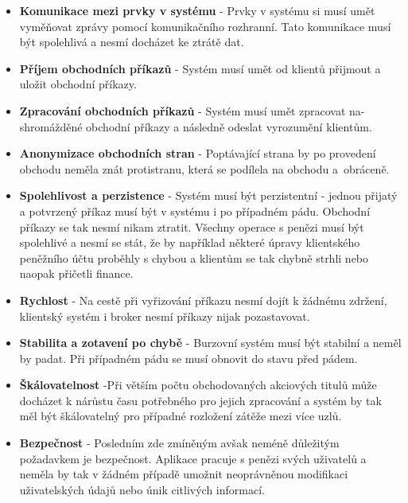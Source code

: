 \documentclass[thesis=M,czech]{FITthesis}[2012/06/26]
\begin{document}
\begin{itemize}

  \item \textbf{Komunikace mezi prvky v systému} - Prvky v systému si musí umět vyměňovat zprávy pomocí komunikačního rozhranní. Tato komunikace musí být spolehlivá a nesmí docházet ke ztrátě dat.

  \item \textbf{Příjem obchodních příkazů} - Systém musí umět od klientů přijmout a uložit obchodní příkazy.

  \item \textbf{Zpracování obchodních příkazů} - Systém musí umět zpracovat na-shromážděné obchodní příkazy a následně odeslat vyrozumění klientům.

  \item \textbf{Anonymizace obchodních stran} - Poptávající strana by po provedení obchodu neměla znát protistranu, která se podílela na obchodu a~obráceně.

  \item \textbf{Spolehlivost a perzistence} - Systém musí být perzistentní - jednou přijatý a potvrzený příkaz musí být v systému i po případném pádu. Obchodní příkazy se tak nesmí nikam ztratit. Všechny operace s penězi musí být spolehlivé a nesmí se stát, že by například některé úpravy klientského peněžního účtu proběhly s chybou a klientům se tak chybně strhli nebo naopak přičetli finance.

  \item \textbf{Rychlost} - Na cestě při vyřizování příkazu nesmí dojít k žádnému zdržení, klientský systém i broker nesmí příkazy nijak pozastavovat.

  \item \textbf{Stabilita a zotavení po chybě} - Burzovní systém musí být stabilní a neměl by padat. Při případném pádu se musí obnovit do stavu před pádem.

  \item \textbf{Škálovatelnost} -Při větším počtu obchodovaných akciových titulů může docházet k nárůstu času potřebného pro jejich zpracování a systém by tak měl být škálovatelný pro případné rozložení zátěže mezi více uzlů.

  \item \textbf{Bezpečnost} - Posledním zde zmíněným avšak neméně důležitým požadavkem je bezpečnost. Aplikace pracuje s penězi svých uživatelů a neměla by tak v žádném případě umožnit neoprávněnou modifikaci uživatelských údajů nebo únik citlivých informací.

\end{itemize}
\end{document}
